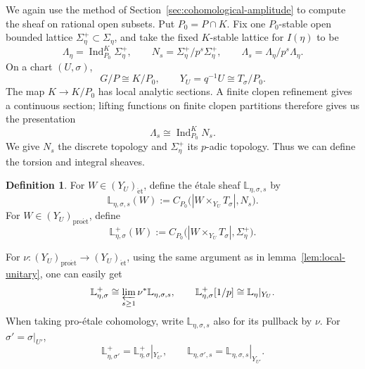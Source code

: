 \documentclass[11pt]{article}
\theoremstyle{definition}
\newtheorem{definition}[theorem]{Definition}
\newcommand{\proet}{\mathrm{pro\acute et}}
\newcommand{\et}{\mathrm{\acute et}}
\newcommand{\Ind}{\operatorname{Ind}}
\begin{document}
We again use the method of Section~\ref{sec:cohomological-amplitude}
to compute the sheaf on rational open subsets.
Put \(P_0=P\cap K\).  Fix one \(P_0\)-stable open bounded
lattice \(\Sigma_\eta^+\subset\Sigma_\eta\), and take the
fixed \(K\)-stable lattice for \(I(\eta)\) to be
\begin{equation*}
 \Lambda_\eta=\Ind_{P_0}^{K}\Sigma_\eta^+,
 \qquad N_s=\Sigma_\eta^+/p^s\Sigma_\eta^+,
 \qquad \Lambda_s=\Lambda_\eta/p^s\Lambda_\eta.
\end{equation*}
On a chart \((U,\sigma)\),
\begin{equation*}
 G/P\cong K/P_0,\qquad Y_U=q^{-1}U\cong T_\sigma/P_0.
\end{equation*}
The map \(K\to K/P_0\) has local analytic sections.  A finite
clopen refinement gives a continuous section; lifting functions on
finite clopen partitions therefore gives us the presentation
\begin{equation*}
 \Lambda_s\cong\Ind_{P_0}^K N_s.
\end{equation*}
We give $N_s$ the discrete topology and $\Sigma_\eta^+$ its
$p$-adic topology. Thus we can define the torsion and integral sheaves.
\begin{definition}
\label{def:local-parabolic-arithmetic-coefficients}
For
\(W\in(Y_U)_{\et}\), define the \'etale sheaf
\(\mathbb L_{\eta,\sigma,s}\) by
\begin{equation*}
 \mathbb L_{\eta,\sigma,s}(W):=
 C_{P_0}\bigl(|W\times_{Y_U}T_\sigma|,N_s\bigr).
\end{equation*}
For \(W\in(Y_U)_{\proet}\), define
\begin{equation*}
 \mathbb L_{\eta,\sigma}^+(W):=
 C_{P_0}\bigl(|W\times_{Y_U}T_\sigma|,\Sigma_\eta^+\bigr).
\end{equation*}
\end{definition}
For \(\nu:(Y_U)_{\proet}\to(Y_U)_{\et}\), using the same argument as in lemma~\ref{lem:local-unitary}, one can easily get
\begin{equation*}
 \mathbb L_{\eta,\sigma}^+
 \cong\varprojlim_{s\ge1}\nu^*\mathbb L_{\eta,\sigma,s},
 \qquad
 \mathbb L_{\eta,\sigma}^+[1/p]
 \cong\mathbb L_\eta|_{Y_U}.
\end{equation*}
When taking pro-\'etale cohomology, write
\(\mathbb L_{\eta,\sigma,s}\) also for its pullback by \(\nu\).
For \(\sigma'=\sigma|_{U'}\),
\begin{equation*}
 \mathbb L_{\eta,\sigma'}^+
 =\mathbb L_{\eta,\sigma}^+|_{Y_{U'}},\qquad
 \mathbb L_{\eta,\sigma',s}
 =\mathbb L_{\eta,\sigma,s}|_{Y_{U'}}.
\end{equation*}
\end{document}
